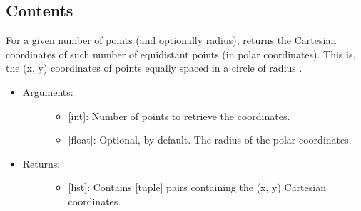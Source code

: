 \documentclass[letterpaper,10pt,english]{sphinxmanual}
\begin{document}
\subsection{Contents}
\label{\detokenize{spatial:contents}}

\begin{fulllineitems}
\label{\detokenize{spatial:data_tools.spatial.equidist_polar}}
For a given number of points (and optionally radius), returns the
Cartesian coordinates of such number of equidistant points (in polar
coordinates). This is, the (x, y) coordinates of  points equally
spaced in a circle of radius .
\begin{itemize}
\item {} \begin{description}
\item[{Arguments:}] \leavevmode\begin{itemize}
\item {} 
 {[}int{]}: Number of points to retrieve the coordinates.

\item {} 
 {[}float{]}: Optional,  by default. The radius of the
polar coordinates.

\end{itemize}

\end{description}

\item {} \begin{description}
\item[{Returns:}] \leavevmode\begin{itemize}
\item {} 
{[}list{]}: Contains  {[}tuple{]} pairs containing the (x, y)
Cartesian coordinates.

\end{itemize}

\end{description}

\end{itemize}

\end{fulllineitems}
\end{document}
